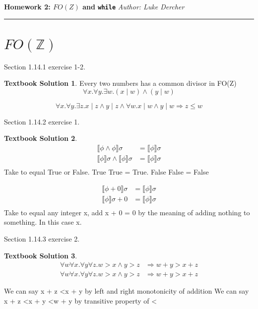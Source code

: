 \documentclass[10pt]{article}
\theoremstyle{definition}
\newtheorem{ts}{Textbook Solution}
\begin{document}
\noindent
\textbf{Homework 2: $FO(Z)$ and \texttt{while}} \hfill \emph{Author: Luke Dercher}
\hrule

\vspace{.3in}

\section*{$FO(\mathbb Z)$}

Section 1.14.1 exercise 1-2.

\begin{ts}
 Every two numbers has a common divisor in FO(Z)
 \begin{equation}
 	\forall x. \forall y. \exists w. ( x \mid w) \wedge (y \mid w)
 \end{equation}
 
 \begin{equation}
 	\forall x. \forall y. \exists z. x \mid z \wedge y \mid z \wedge \forall w. x \mid w \wedge y \mid w \Rightarrow z \leq w
 \end{equation}
\end{ts}

Section 1.14.2 exercise 1.

\begin{ts}

\begin{align*}
	\llbracket \phi \wedge \phi \rrbracket \sigma &=  \llbracket \phi \rrbracket \sigma \\ \llbracket \phi \rrbracket \sigma \wedge \llbracket \phi \rrbracket \sigma &=  \llbracket \phi \rrbracket \sigma \\
\end{align*}
 Take \textphi to equal True or False. True \textturnv  True = True. False \textturnv  False = False
 
 \begin{align*}
	\llbracket \phi + 0 \rrbracket \sigma &=  \llbracket \phi \rrbracket \sigma \\ \llbracket \phi \rrbracket \sigma + 0 &=  \llbracket \phi \rrbracket \sigma \\
\end{align*}
Take \textphi to equal any integer x, add x + 0 = 0 by the meaning of adding nothing to something. In this case x. 

\end{ts}

Section 1.14.3 exercise 2.

\begin{ts}

\begin{align*}
\forall w \forall x. \forall y \forall z. w > x \wedge y > z &\Rightarrow w + y > x + z \\ \forall w \forall x. \forall y \forall z. w > x \wedge y > z &\Rightarrow w + y > x + z
\end{align*}

We can say x + z \textless x + y by left and right monotonicity of addition
We can say x + z \textless x + y \textless w + y by transitive property of \textless
\end{ts}
\end{document}

